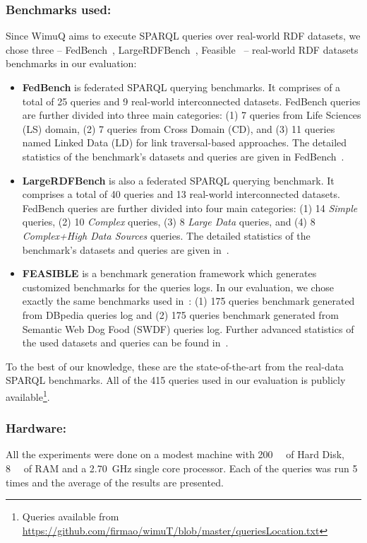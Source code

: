 \documentclass[sw]{iosart2x}
\begin{document}
\subsubsection{Benchmarks used:} Since WimuQ aims to execute SPARQL queries over real-world RDF datasets, we chose three -- FedBench~\cite{fedbench2011}, LargeRDFBench~\cite{largerdfbench2017}, Feasible~\cite{feasible2015} -- real-world RDF datasets benchmarks in our evaluation: 
\begin{itemize}
  
\item \textbf{FedBench} is federated SPARQL querying benchmarks. It comprises of a total of 25 queries and 9 real-world interconnected datasets. FedBench queries are further divided into three main categories: (1) 7 queries from Life Sciences (LS) domain, (2) 7 queries from Cross Domain (CD), and (3) 11 queries named Linked Data (LD) for link traversal-based approaches. The detailed statistics of the benchmark's datasets and queries are given in FedBench~\cite{fedbench2011}.

\item  \textbf{LargeRDFBench} is also a federated SPARQL querying benchmark. It comprises a total of 40 queries and 13 real-world interconnected datasets. FedBench queries are further divided into four main categories: (1) 14 \emph{Simple} queries, (2) 10 \emph{Complex} queries, (3)  8 \emph{Large Data} queries, and (4) 8 \emph{Complex+High Data Sources} queries. The detailed statistics of the benchmark's datasets and queries are given in~\cite{largerdfbench2017}. 

\item  \textbf{FEASIBLE} is a benchmark generation framework which generates customized benchmarks for the queries logs. In our evaluation, we chose exactly the same benchmarks used in~\cite{feasible2015}: (1) 175 queries benchmark generated from DBpedia queries log and (2) 175 queries benchmark generated from Semantic Web Dog Food (SWDF) queries log. Further advanced statistics of the used datasets and queries can be found in~\cite{feasible2015}. 
\end{itemize}
To the best of our knowledge, these are the state-of-the-art from the real-data SPARQL benchmarks. All of the 415 queries used in our evaluation is publicly available\footnote{Queries available from \url{https://github.com/firmao/wimuT/blob/master/queriesLocation.txt}}. 

\subsubsection{Hardware:} All the experiments were done on a modest machine with \SI{200}{\gibi\byte} of Hard Disk, \SI{8}{\gibi\byte} of RAM and a \SI{2.70}{\GHz} single core processor. Each of the queries was run 5 times and the average of the results are presented.  
\end{document}
